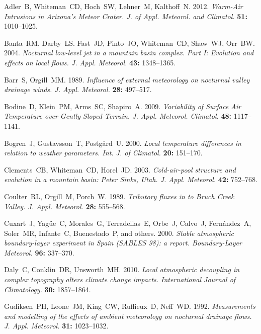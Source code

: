\documentclass[times]{qjrms4}
\begin{document}
\begin{thebibliography}{99}

Adler~B, Whiteman~CD, Hoch~SW, Lehner~M, Kalthoff~N. 2012.
\emph{Warm-Air Intrusions in Arizona's Meteor Crater. J. of Appl. Meteorol. and Climatol.}
{\bf 51:} 1010--1025.

Banta~RM, Darby~LS. Fast~JD, Pinto~JO, Whiteman~CD, Shaw~WJ, Orr~BW. 2004.
\emph{Nocturnal low-level jet in a mountain basin complex. Part I: Evolution and effects on local flows. J. Appl. Meteorol.} {\bf 43:} 1348--1365.

Barr~S, Orgill~MM. 1989. \emph{Influence of external meteorology on nocturnal valley drainage winds. J. Appl. Meteorol.} {\bf 28:} 497--517.

Bodine~D, Klein~PM, Arms~SC, Shapiro~A. 2009. \emph{Variability of Surface Air Temperature over Gently Sloped Terrain. J. Appl. Meteorol. Climatol.} {\bf 48:} 1117--1141.

Bogren~J, Gustavsson~T, Postg{\aa}rd~U. 2000. \emph{Local temperature differences in relation to weather parameters. Int. J. of Climatol.} {\bf 20:} 151--170.

Clements~CB, Whiteman~CD, Horel~JD. 2003. \emph{Cold-air-pool structure and evolution in a mountain basin: Peter Sinks, Utah. J. Appl. Meteorol.} {\bf 42:} 752--768.

Coulter~RL, Orgill~M, Porch~W. 1989. \emph{Tributory fluxes in to Bruch Creek Valley. J. Appl. Meteorol.} {\bf 28:} 555--568.

Cuxart~J, Yag{\"u}e~C, Morales~G, Terradellas~E, Orbe~J, Calvo~J, Fern{\'a}ndez~A, Soler~MR, Infante~C, Buenestado~P, and others. 2000. \emph{Stable atmospheric boundary-layer experiment in Spain (SABLES 98): a report. Boundary-Layer Meteorol.} {\bf 96:} 337--370.

Daly~C, Conklin~DR, Unsworth~MH. 2010. \emph{Local atmospheric decoupling in complex topography alters climate change impacts. International Journal of Climatology.} {\bf 30:} 1857--1864.

Gudiksen~PH, Leone~JM, King~CW, Ruffieux~D, Neff~WD. 1992. \emph{Measurements and modelling of the effects of ambient meteorology on nocturnal drainage flows. J. Appl. Meteorol.} {\bf 31:} 1023--1032.


\end{thebibliography}
\end{document}
